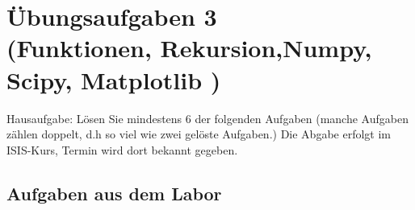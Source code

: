 

\usepackage[T1]{fontenc}




\section*{Übungsaufgaben 3 \\
(Funktionen, Rekursion,Numpy, Scipy, Matplotlib )}

Hausaufgabe: Lösen Sie mindestens 6 der folgenden Aufgaben (manche Aufgaben zählen doppelt, d.h so viel wie zwei gelöste Aufgaben.)
Die Abgabe erfolgt im ISIS-Kurs, Termin wird dort bekannt gegeben.

\subsection*{Aufgaben aus dem Labor}


